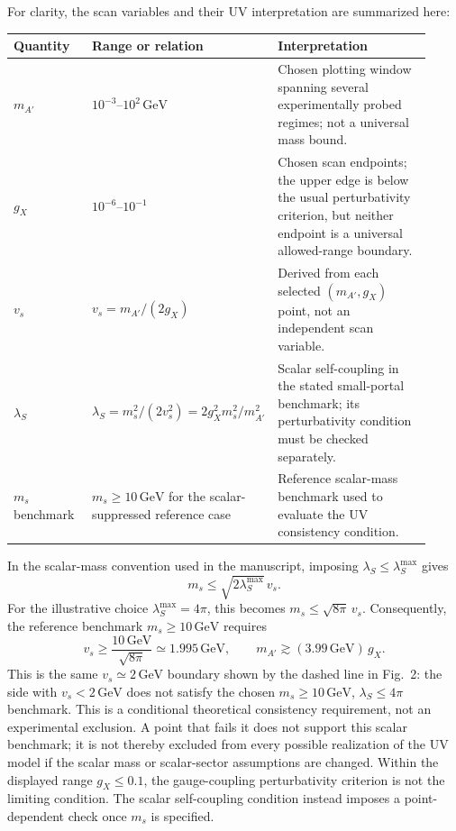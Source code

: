 \documentclass[12pt,a4paper]{article}
\begin{document}
For clarity, the scan variables and their UV interpretation are summarized here:
\begin{center}
\small
\begin{tabular}{@{}P{0.19\linewidth}P{0.34\linewidth}P{0.39\linewidth}@{}}
\hline
Quantity & Range or relation & Interpretation\\
\hline
\(m_{A'}\) & \(10^{-3}\)--\(10^2\,\mathrm{GeV}\) & Chosen plotting window spanning several experimentally probed regimes; not a universal mass bound.\\
\(g_X\) & \(10^{-6}\)--\(10^{-1}\) & Chosen scan endpoints; the upper edge is below the usual perturbativity criterion, but neither endpoint is a universal allowed-range boundary.\\
\(v_s\) & \(v_s=m_{A'}/(2g_X)\) & Derived from each selected \((m_{A'},g_X)\) point, not an independent scan variable.\\
\(\lambda_S\) & \(\lambda_S=m_s^2/(2v_s^2)=2g_X^2m_s^2/m_{A'}^2\) & Scalar self-coupling in the stated small-portal benchmark; its perturbativity condition must be checked separately.\\
\(m_s\) benchmark & \(m_s\geq10\,\mathrm{GeV}\) for the scalar-suppressed reference case & Reference scalar-mass benchmark used to evaluate the UV consistency condition.\\
\hline
\end{tabular}
\end{center}

In the scalar-mass convention used in the manuscript, imposing \(\lambda_S\leq\lambda_S^{\max}\) gives
\[
m_s\leq\sqrt{2\lambda_S^{\max}}\,v_s.
\]
For the illustrative choice \(\lambda_S^{\max}=4\pi\), this becomes \(m_s\leq\sqrt{8\pi}\,v_s\). Consequently, the reference benchmark \(m_s\geq10\,\mathrm{GeV}\) requires
\[
v_s\geq\frac{10\,\mathrm{GeV}}{\sqrt{8\pi}}
\simeq1.995\,\mathrm{GeV},
\qquad
m_{A'}\gtrsim(3.99\,\mathrm{GeV})\,g_X.
\]
This is the same \(v_s\simeq2\,\mathrm{GeV}\) boundary shown by the dashed line in Fig.~2: the side with \(v_s<2\,\mathrm{GeV}\) does not satisfy the chosen \(m_s\geq10\,\mathrm{GeV}\), \(\lambda_S\leq4\pi\) benchmark. This is a conditional theoretical consistency requirement, not an experimental exclusion. A point that fails it does not support this scalar benchmark; it is not thereby excluded from every possible realization of the UV model if the scalar mass or scalar-sector assumptions are changed. Within the displayed range \(g_X\leq0.1\), the gauge-coupling perturbativity criterion is not the limiting condition. The scalar self-coupling condition instead imposes a point-dependent check once \(m_s\) is specified.
\end{document}
